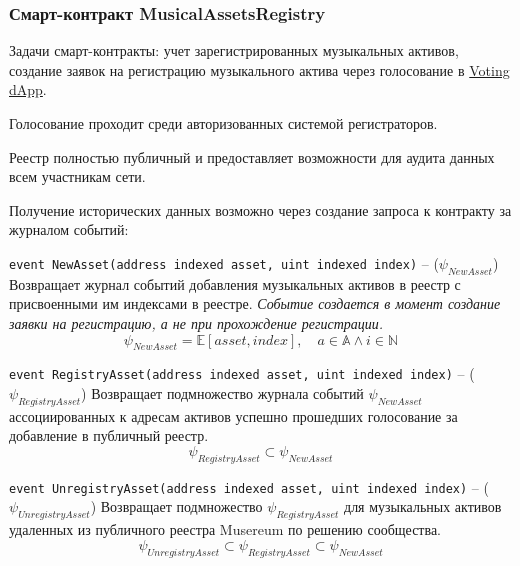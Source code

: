 \documentclass[12pt]{report}
\def\code#1{\colorbox{light-gray}{\texttt{#1}}}
\begin{document}
\subsubsection{Смарт-контракт MusicalAssetsRegistry}
\label{tech-apps-assets-registry}
\begin{multicols}{2}
Задачи смарт-контракты: учет зарегистрированных музыкальных активов, создание заявок на регистрацию музыкального актива через голосование в \hyperref[tech-apps-voting]{Voting dApp}.

Голосование проходит среди авторизованных системой регистраторов. 

Реестр полностью публичный и предоставляет возможности для аудита данных всем участникам сети. 

Получение исторических данных возможно через создание запроса к контракту за журналом событий:
\end{multicols}

\code{event NewAsset(address indexed asset, uint indexed index)} – ($\psi_{NewAsset}$)\hfill\null\linebreak
Возвращает журнал событий добавления музыкальных активов в реестр с присвоенными им индексами в реестре. 
\textit{Событие создается в момент создание заявки на регистрацию, а не при прохождение регистрации.}
\begin{equation}
\psi_{NewAsset} = \mathbb{E}[asset, index], \quad a \in \mathbb{A} \wedge i \in \mathbb{N}
\end{equation}

\code{event RegistryAsset(address indexed asset, uint indexed index)} – ($\psi_{RegistryAsset}$)\hfill\null\linebreak
Возвращает подмножество журнала событий $\psi_{NewAsset}$ ассоциированных к адресам активов успешно прошедших голосование за добавление в публичный реестр.
\begin{equation}
\psi_{RegistryAsset} \subset \psi_{NewAsset}
\end{equation}

\code{event UnregistryAsset(address indexed asset, uint indexed index)} – ($\psi_{UnregistryAsset}$)\hfill\null\linebreak
Возвращает подмножество $\psi_{RegistryAsset}$ для музыкальных активов удаленных из публичного реестра Musereum по решению сообщества.
\begin{equation}
\psi_{UnregistryAsset} \subset \psi_{RegistryAsset} \subset \psi_{NewAsset}
\end{equation}
\end{document}
